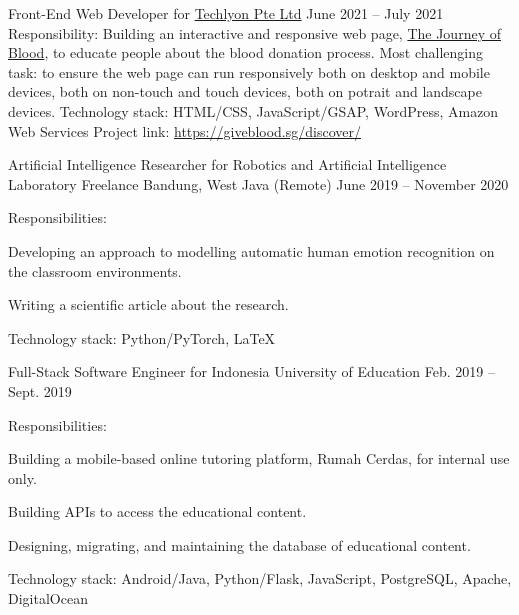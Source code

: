 \begin{cventries}

\cventry
{Front-End Web Developer for \href{https://helloakin.com/}{Techlyon Pte Ltd}} %
{} %
{} %
{June 2021 -- July 2021} %
{ %
Responsibility: Building an interactive and responsive web page, \href{https://giveblood.sg/discover/}{The Journey of Blood}, to educate people about the blood donation process.
\linebreak
Most challenging task: to ensure the web page can run responsively both on desktop and mobile devices, both on non-touch and touch devices, both on potrait and landscape devices.
\linebreak
Technology stack: HTML/CSS, JavaScript/GSAP, WordPress, Amazon Web Services
\linebreak
Project link: \href{https://giveblood.sg/discover/}{https://giveblood.sg/discover/}
}


\cventry
{Artificial Intelligence Researcher for Robotics and Artificial Intelligence Laboratory} %
{Freelance} %
{Bandung, West Java (Remote)} %
{June 2019 -- November 2020} %
{ %
Responsibilities:
\vspace{5mm}
\begin{cvitems}
\item {Developing an approach to modelling automatic human emotion recognition on the classroom environments.}
\item {Writing a scientific article about the research.}
\end{cvitems}
\vspace{4mm}
Technology stack: Python/PyTorch, LaTeX
}


\cventry
{Full-Stack Software Engineer for Indonesia University of Education} %
{} %
{} %
{Feb. 2019 -- Sept. 2019} %
{ %
Responsibilities:
\vspace{5mm}
\begin{cvitems}
\item {Building a mobile-based online tutoring platform, Rumah Cerdas, for internal use only.}
\item {Building APIs to access the educational content.}
\item {Designing, migrating, and maintaining the database of educational content.}
\end{cvitems}
\vspace{4mm}
Technology stack: Android/Java, Python/Flask, JavaScript, PostgreSQL, Apache, DigitalOcean
}


\end{cventries}
